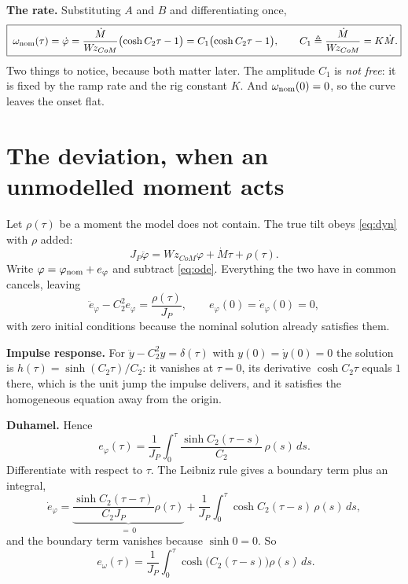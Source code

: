 \documentclass[11pt]{article}
\newcommand{\Wz}{W\!z_{CoM}}
\begin{document}
\textbf{The rate.} Substituting $A$ and $B$ and differentiating once,
\begin{equation}
  \boxed{\;
  \omega_{\rm nom}(\tau) = \dot\varphi
   = \frac{\dot M}{\Wz}\bigl(\cosh C_2\tau - 1\bigr)
   = C_1\bigl(\cosh C_2\tau - 1\bigr),
  \qquad C_1 \triangleq \frac{\dot M}{\Wz} = K\dot M . }
  \label{eq:nom}
\end{equation}
Two things to notice, because both matter later. The amplitude $C_1$ is
\emph{not free}: it is fixed by the ramp rate and the rig constant $K$.
And $\omega_{\rm nom}(0) = 0$, so the curve leaves the onset flat.

\section{The deviation, when an unmodelled moment acts}

Let $\rho(\tau)$ be a moment the model does not contain. The true
tilt obeys \eqref{eq:dyn} with $\rho$ added:
\[
  J_P\ddot\varphi = \Wz\varphi + \dot M\tau + \rho(\tau).
\]
Write $\varphi = \varphi_{\rm nom} + e_\varphi$ and subtract
\eqref{eq:ode}. Everything the two have in common cancels, leaving
\begin{equation}
  \ddot e_\varphi - C_2^{2}e_\varphi = \frac{\rho(\tau)}{J_P},
  \qquad e_\varphi(0) = \dot e_\varphi(0) = 0 ,
  \label{eq:dev}
\end{equation}
with zero initial conditions because the nominal solution already
satisfies them.

\textbf{Impulse response.} For $\ddot y - C_2^2y = \delta(\tau)$ with
$y(0) = \dot y(0) = 0$ the solution is $h(\tau) = \sinh(C_2\tau)/C_2$:
it vanishes at $\tau = 0$, its derivative $\cosh C_2\tau$ equals $1$
there, which is the unit jump the impulse delivers, and it satisfies the
homogeneous equation away from the origin.

\textbf{Duhamel.} Hence
\begin{equation}
  e_\varphi(\tau)
   = \frac{1}{J_P}\int_0^{\tau}\frac{\sinh C_2(\tau-s)}{C_2}\,\rho(s)\,ds .
\end{equation}
Differentiate with respect to $\tau$. The Leibniz rule gives a boundary
term plus an integral,
\[
  \dot e_\varphi
   = \underbrace{\frac{\sinh C_2(\tau-\tau)}{C_2J_P}\rho(\tau)}_{= \,0}
   + \frac{1}{J_P}\int_0^{\tau}\cosh C_2(\tau-s)\,\rho(s)\,ds ,
\]
and the boundary term vanishes because $\sinh 0 = 0$. So
\begin{equation}
  \boxed{\;
  e_\omega(\tau) = \frac{1}{J_P}\int_0^{\tau}
                    \cosh\!\bigl(C_2(\tau-s)\bigr)\rho(s)\,ds . }
  \label{eq:eom}
\end{equation}
\end{document}

